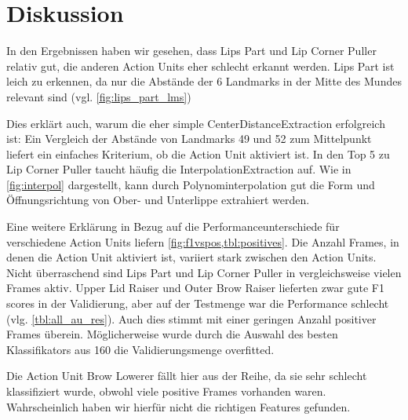 \chapter{Diskussion}

In den Ergebnissen haben wir gesehen, dass Lips Part und Lip Corner Puller
relativ gut, die anderen Action Units eher schlecht erkannt werden. Lips Part
ist leich zu erkennen, da nur die Abstände der 6 Landmarks in der Mitte des
Mundes relevant sind (vgl. \cref{fig:lips_part_lms})

Dies erklärt auch, warum die eher simple CenterDistanceExtraction erfolgreich
ist: Ein Vergleich der Abstände von Landmarks 49 und 52 zum Mittelpunkt liefert
ein einfaches Kriterium, ob die Action Unit aktiviert ist.
In den Top 5 zu Lip Corner Puller taucht häufig die InterpolationExtraction auf.
Wie in \cref{fig:interpol} dargestellt, kann durch Polynominterpolation gut die
Form und Öffnungsrichtung von Ober- und Unterlippe extrahiert werden. 

Eine weitere Erklärung in Bezug auf die Performanceunterschiede für verschiedene
Action Units liefern \cref{fig:f1vspos,tbl:positives}. Die Anzahl Frames, in
denen die Action Unit aktiviert ist, variiert stark zwischen den Action Units.
Nicht überraschend sind Lips Part und Lip Corner Puller in vergleichsweise
vielen Frames aktiv. Upper Lid Raiser und Outer Brow Raiser lieferten
zwar gute F1 scores in der Validierung, aber auf der Testmenge war die
Performance schlecht (vlg. \cref{tbl:all_au_res}). Auch dies stimmt mit einer
geringen Anzahl positiver Frames überein. Möglicherweise wurde durch die Auswahl
des besten Klassifikators aus 160 die Validierungsmenge overfitted.

Die Action Unit Brow Lowerer fällt hier aus der Reihe, da sie sehr schlecht
klassifiziert wurde, obwohl viele positive Frames vorhanden waren.
Wahrscheinlich haben wir hierfür nicht die richtigen Features gefunden.



